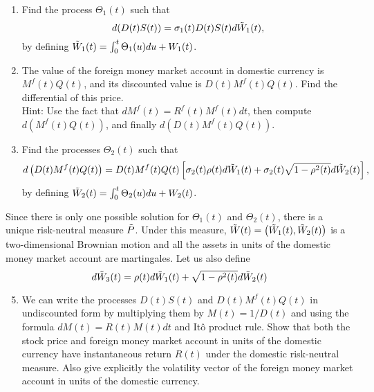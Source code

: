\documentclass[11pt,a4,table]{article}
\begin{document}
\begin{enumerate}
\begin{enumerate}
        \item Find the process $\Theta_1(t)$ such that
        \begin{equation*}
            d(D(t)S(t)) = \sigma_1(t)D(t)S(t) d\Tilde{W}_1(t),
        \end{equation*}
        by defining $\Tilde{W}_1(t)=\int_0^t\Theta_1(u) du + W_1(t)$.
        
        \item The value of the foreign money market account in domestic currency is $M^f(t)Q(t)$, and its discounted value is $D(t)M^f(t)Q(t)$. Find the differential of this price.\\
        Hint: Use the fact that $dM^f(t) = R^f(t) M^f(t) dt$, then compute $d(M^f(t)Q(t))$, and finally $d\left(D(t)M^f(t)Q(t)\right)$.
        
        \item Find the processes $\Theta_2(t)$ such that
        \begin{equation*}
            d\left(D(t)M^f(t)Q(t)\right) = D(t)M^f(t)Q(t) \left[\sigma_2(t)\rho(t) d\Tilde{W}_1(t) + \sigma_2(t)\sqrt{1-\rho^2(t)} d\Tilde{W}_2(t)\right],
        \end{equation*}
        by defining $\Tilde{W}_2(t) = \int_0^t \Theta_2(u) du + W_2(t)$.
    \end{enumerate}
    
    Since there is only one possible solution for $\Theta_1(t)$ and $\Theta_2(t)$, there is a unique risk-neutral measure $\Tilde{P}$. Under this measure, $\Tilde{W}(t)=\left(\Tilde{W}_1(t),\Tilde{W}_2(t)\right)$ is a two-dimensional Brownian motion and all the assets in units of the domestic money market account are martingales. Let us also define
    \begin{equation*}
        d\Tilde{W}_3(t)=\rho(t) d\Tilde{W}_1(t) + \sqrt{1-\rho^2(t)} d\Tilde{W}_2(t)
    \end{equation*}
    
    \begin{enumerate}
        \setcounter{enumii}{4}
    
        \item We can write the processes $D(t)S(t)$ and $D(t)M^f(t)Q(t)$ in undiscounted form by multiplying them by $M(t)=1/D(t)$ and using the formula $dM(t) = R(t)M(t) dt$ and Itô product rule. Show that both the stock price and foreign money market account in units of the domestic currency have instantaneous return $R(t)$ under the domestic risk-neutral measure. Also give explicitly the volatility vector of the foreign money market account in units of the domestic currency.
    \end{enumerate}
    

\end{enumerate}
\end{document}
